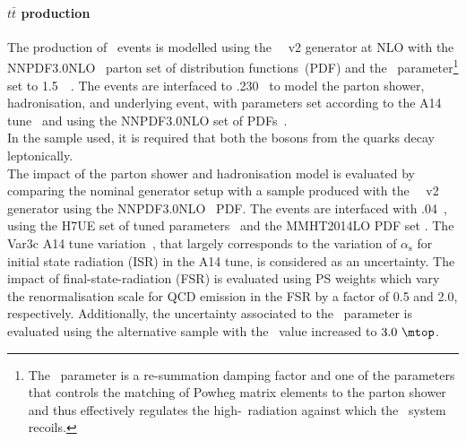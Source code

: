 \paragraph{$t\bar{t}$ production} 
The production of \ttbar\ events is modelled using the
\powhegbox~\cite{Frixione:2007nw,Nason:2004rx,Frixione:2007vw,Alioli:2010xd}~v2
generator at NLO with the \textsc{NNPDF3.0NLO}~\cite{Ball:2014uwa} parton set
of distribution functions~(PDF) and the \hdamp\ parameter\footnote{The
	\hdamp\ parameter is a re-summation damping factor and one of the
	parameters that controls the matching of Powheg matrix elements to
	the parton shower and thus effectively regulates the
	high-\pt\ radiation against which the \ttbar\ system recoils.} set
to 1.5~\mtop~\cite{ATL-PHYS-PUB-2016-020}.  The events are interfaced
to \pythia.230~\cite{Sjostrand:2014zea} to model the parton shower,
hadronisation, and underlying event, with parameters set according
to the A14 tune~\cite{ATL-PHYS-PUB-2014-021} and using the \textsc{NNPDF3.0NLO}
set of PDFs~\cite{Ball:2012cx}.\\
In the sample used, it is required that both the \PW bosons from the \Pqt quarks decay leptonically.\\
The impact of the parton shower and hadronisation model is evaluated
by comparing the nominal generator setup with a sample produced with
the
\powhegbox~\cite{Frixione:2007nw,Nason:2004rx,Frixione:2007vw,Alioli:2010xd}~v2
generator using the \textsc{NNPDF3.0NLO}~\cite{Ball:2014uwa} PDF. The events are interfaced with
\herwigseven.04~\cite{Bahr:2008pv,Bellm:2015jjp}, using the H7UE set
of tuned parameters~\cite{Bellm:2015jjp} and the MMHT2014LO PDF set
\cite{Harland-Lang:2014zoa}.
The Var3c A14 tune variation~\cite{ATL-PHYS-PUB-2014-021}, that largely corresponds to the variation of
$\alpha_{\textrm{s}}$ for initial state radiation (ISR) in the A14
tune, is considered as an uncertainty. The impact of final-state-radiation (FSR) is evaluated using PS
weights which vary the renormalisation scale for QCD emission in the
FSR by a factor of 0.5 and 2.0, respectively.
Additionally, the uncertainty associated to the \hdamp\ parameter is evaluated using the
alternative sample with the \hdamp\ value increased to $3.0~\mtop$. 

